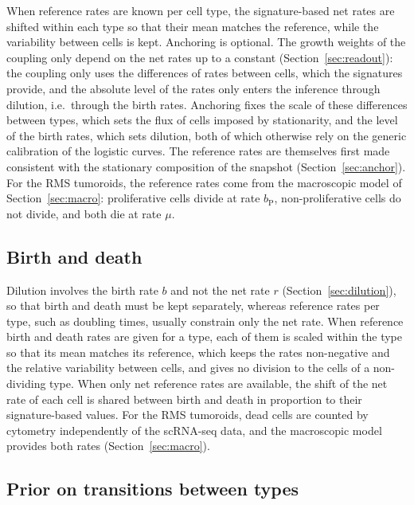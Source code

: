 \documentclass[a4paper, 11pt]{article}
\newcommand{\cP}{\mathrm{P}}
\theoremstyle{plain}
\theoremstyle{remark}
\begin{document}
When reference rates are known per cell type, the signature-based net rates are shifted within each type so that their mean matches the reference, while the variability between cells is kept. Anchoring is optional. The growth weights of the coupling only depend on the net rates up to a constant (Section~\ref{sec:readout}): the coupling only uses the differences of rates between cells, which the signatures provide, and the absolute level of the rates only enters the inference through dilution, i.e.\ through the birth rates. Anchoring fixes the scale of these differences between types, which sets the flux of cells imposed by stationarity, and the level of the birth rates, which sets dilution, both of which otherwise rely on the generic calibration of the logistic curves. The reference rates are themselves first made consistent with the stationary composition of the snapshot (Section~\ref{sec:anchor}). For the RMS tumoroids, the reference rates come from the macroscopic model of Section~\ref{sec:macro}: proliferative cells divide at rate $b_\cP$, non-proliferative cells do not divide, and both die at rate $\mu$.

\subsection{Birth and death}

Dilution involves the birth rate $b$ and not the net rate $r$ (Section~\ref{sec:dilution}), so that birth and death must be kept separately, whereas reference rates per type, such as doubling times, usually constrain only the net rate. When reference birth and death rates are given for a type, each of them is scaled within the type so that its mean matches its reference, which keeps the rates non-negative and the relative variability between cells, and gives no division to the cells of a non-dividing type. When only net reference rates are available, the shift of the net rate of each cell is shared between birth and death in proportion to their signature-based values. For the RMS tumoroids, dead cells are counted by cytometry independently of the scRNA-seq data, and the macroscopic model provides both rates (Section~\ref{sec:macro}).

\subsection{Prior on transitions between types}\label{sec:prior}
\end{document}

